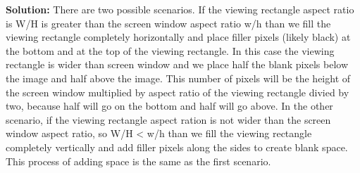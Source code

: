 \documentclass[a4paper, 12pt]{article}
\begin{document}
\begin{enumerate}
        \textbf{Solution:} There are two possible scenarios. If the viewing rectangle aspect ratio is W/H is greater than the screen window aspect ratio w/h than we fill the viewing rectangle completely horizontally and place filler pixels (likely black) at the bottom and at the top of the viewing rectangle. In this case the viewing rectangle is wider than screen window and we place half the blank pixels below the image and half above the image. This number of pixels will be the height of the screen window multiplied by aspect ratio of the viewing rectangle divied by two, because half will go on the bottom and half will go above. In the other scenario, if the viewing rectangle aspect ration is not wider than the screen window aspect ratio, so W/H < w/h than we fill the viewing rectangle completely vertically and add filler pixels along the sides to create blank space. This process of adding space is the same as the first scenario.
\end{enumerate}
\end{document}
